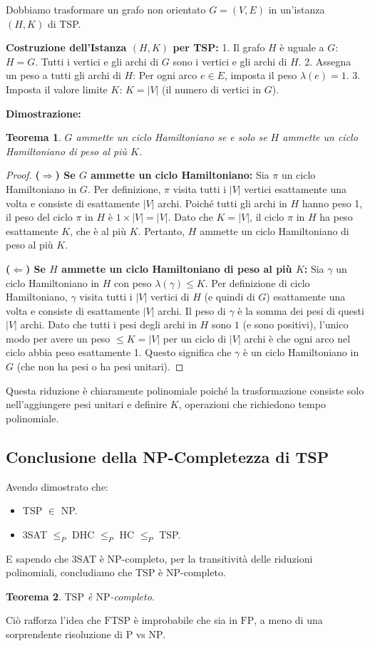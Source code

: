 \documentclass[a4paper]{article}
\newtheorem{theorem}{Teorema}
\begin{document}
Dobbiamo trasformare un grafo non orientato $G=(V, E)$ in un'istanza $(H, K)$ di TSP.

\textbf{Costruzione dell'Istanza $(H, K)$ per TSP:}
1.  Il grafo $H$ è uguale a $G$: $H=G$. Tutti i vertici e gli archi di $G$ sono i vertici e gli archi di $H$.
2.  Assegna un peso a tutti gli archi di $H$: Per ogni arco $e \in E$, imposta il peso $\lambda(e)=1$.
3.  Imposta il valore limite $K$: $K=|V|$ (il numero di vertici in $G$).

\textbf{Dimostrazione:}
\begin{theorem}
$G$ ammette un ciclo Hamiltoniano se e solo se $H$ ammette un ciclo Hamiltoniano di peso al più $K$.
\end{theorem}
\begin{proof}
\textbf{($\Rightarrow$) Se $G$ ammette un ciclo Hamiltoniano:}
Sia $\pi$ un ciclo Hamiltoniano in $G$. Per definizione, $\pi$ visita tutti i $|V|$ vertici esattamente una volta e consiste di esattamente $|V|$ archi.
Poiché tutti gli archi in $H$ hanno peso 1, il peso del ciclo $\pi$ in $H$ è $1 \times |V| = |V|$.
Dato che $K=|V|$, il ciclo $\pi$ in $H$ ha peso esattamente $K$, che è al più $K$.
Pertanto, $H$ ammette un ciclo Hamiltoniano di peso al più $K$.

\textbf{($\Leftarrow$) Se $H$ ammette un ciclo Hamiltoniano di peso al più $K$:}
Sia $\gamma$ un ciclo Hamiltoniano in $H$ con peso $\lambda(\gamma) \le K$.
Per definizione di ciclo Hamiltoniano, $\gamma$ visita tutti i $|V|$ vertici di $H$ (e quindi di $G$) esattamente una volta e consiste di esattamente $|V|$ archi.
Il peso di $\gamma$ è la somma dei pesi di questi $|V|$ archi. Dato che tutti i pesi degli archi in $H$ sono $1$ (e sono positivi), l'unico modo per avere un peso $\le K=|V|$ per un ciclo di $|V|$ archi è che ogni arco nel ciclo abbia peso esattamente 1.
Questo significa che $\gamma$ è un ciclo Hamiltoniano in $G$ (che non ha pesi o ha pesi unitari).
\end{proof}

Questa riduzione è chiaramente polinomiale poiché la trasformazione consiste solo nell'aggiungere pesi unitari e definire $K$, operazioni che richiedono tempo polinomiale.

\subsection{Conclusione della NP-Completezza di TSP}

Avendo dimostrato che:
\begin{itemize}
    \item TSP $\in$ NP.
    \item 3SAT $\le_P$ DHC $\le_P$ HC $\le_P$ TSP.
\end{itemize}
E sapendo che 3SAT è NP-completo, per la transitività delle riduzioni polinomiali, concludiamo che TSP è NP-completo.

\begin{theorem}
$\text{TSP}$ è $\text{NP}$-completo.
\end{theorem}

Ciò rafforza l'idea che $\text{FTSP}$ è improbabile che sia in $\text{FP}$, a meno di una sorprendente risoluzione di $\text{P}$ vs $\text{NP}$.
\end{document}
